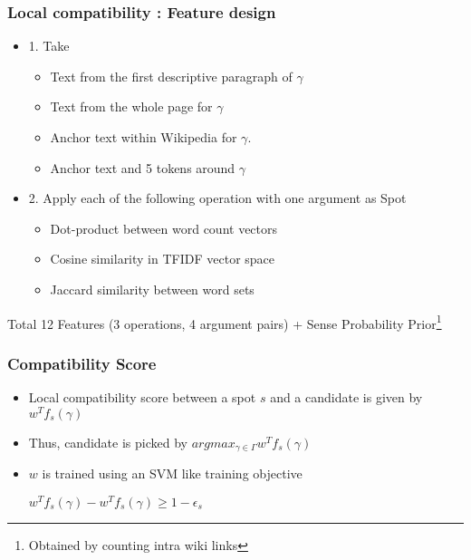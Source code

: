 \documentclass{beamer}
\begin{document}
\begin{frame}

\frametitle{Local compatibility : Feature design} 
\begin{itemize}
 \item 1. Take
\begin{itemize} 
 \item Text from the first descriptive paragraph of $\gamma$
  \item Text from the whole page for $\gamma$
  \item Anchor text within Wikipedia for $\gamma$.
  \item Anchor text and 5 tokens around $\gamma$ 
 \end{itemize}
 
 \item 2. Apply each of the following operation with one argument as Spot
    \begin{itemize}
      \item{Dot-product between word count vectors}
      \item{Cosine similarity in TFIDF vector space}
      \item{Jaccard similarity between word sets}
 \end{itemize} 
 \end{itemize}
 Total 12 Features (3 operations, 4 argument pairs) + Sense Probability Prior\footnote{Obtained by counting intra wiki links}
 
\end{frame}

\begin{frame}
 \frametitle{Compatibility Score}
 \begin{itemize}
 \item Local compatibility score between a spot $s$ and a candidate is given by $w^{T}f_s(\gamma)$
 \item Thus, candidate is picked by $argmax_{\gamma\in\Gamma}w^{T}f_s(\gamma)$
 \item $w$ is trained using an SVM like training objective
 \begin{center} $w^{T}f_s(\gamma) - w^{T}f_s(\gamma) \geq 1 - \epsilon_s$ \end{center}
 \end{itemize}
 
 \end{frame}
\end{document}
